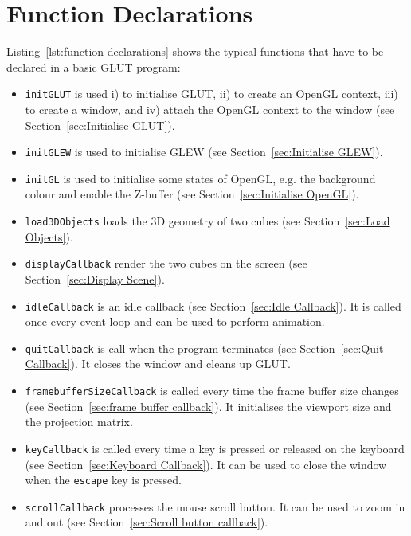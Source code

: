 \documentclass[11pt,oneside,a4paper,final]{article}
\begin{document}
\begin{center}

\end{center}


\section{Function Declarations}
\label{sec:Function Declarations}

Listing~\ref{lst:function declarations} shows the typical functions 
that have to be declared in a basic GLUT program:
\begin{itemize}
 \item \verb+initGLUT+ is used i) to initialise GLUT, ii) to create an OpenGL 
	context, iii) to create a window, and iv) attach the OpenGL context to the 
	window (see Section~\ref{sec:Initialise GLUT}).
 \item \verb+initGLEW+ is used to initialise GLEW (see 
	Section~\ref{sec:Initialise GLEW}).
 \item \verb+initGL+ is used to initialise some states of OpenGL, e.g. the 
	background colour and enable the Z-buffer (see 
	Section~\ref{sec:Initialise OpenGL}).
 \item \verb+load3DObjects+ loads the 3D geometry of two cubes (see 
	Section~\ref{sec:Load Objects}).
 \item \verb+displayCallback+ render the two cubes on the screen (see 
	Section~\ref{sec:Display Scene}).
 \item \verb+idleCallback+ is an idle callback 
	(see Section~\ref{sec:Idle Callback}). It is called once every event 
	loop and can be used to perform animation.
 \item \verb+quitCallback+ is call when the program terminates  (see 
	Section~\ref{sec:Quit Callback}). It closes the window and cleans up 
	GLUT.
 \item \verb+framebufferSizeCallback+ is called every time the frame buffer 
	size changes (see Section~\ref{sec:frame buffer callback}). It initialises 
	the viewport size and the projection matrix.
 \item \verb+keyCallback+ is called every time a key is pressed or released on 
	the keyboard (see Section~\ref{sec:Keyboard Callback}). It can be used to 
	close the window when the \verb+escape+ key is pressed.
\item \verb+scrollCallback+ processes the mouse scroll button. It can be used 
	to zoom in and out (see Section~\ref{sec:Scroll button callback}).
\end{itemize}
\end{document}
